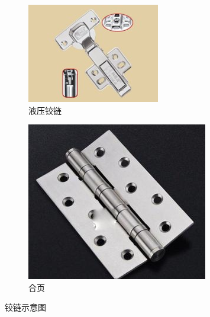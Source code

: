 \documentclass[UTF8]{article} %
\begin{document}
\begin{figure}[H]
  \centering
  \begin{subfigure}[b]{0.3\textwidth}
         \centering
         \includegraphics[width=\textwidth]{jl1.png}
          \caption{液压铰链}
  \end{subfigure}
  \quad
  \begin{subfigure}[b]{0.25\textwidth}
          \centering
          \includegraphics[width=\textwidth]{jl2.png}
          \caption{合页}
  \end{subfigure}
  \caption{铰链示意图}
\end{figure}
\end{document}
